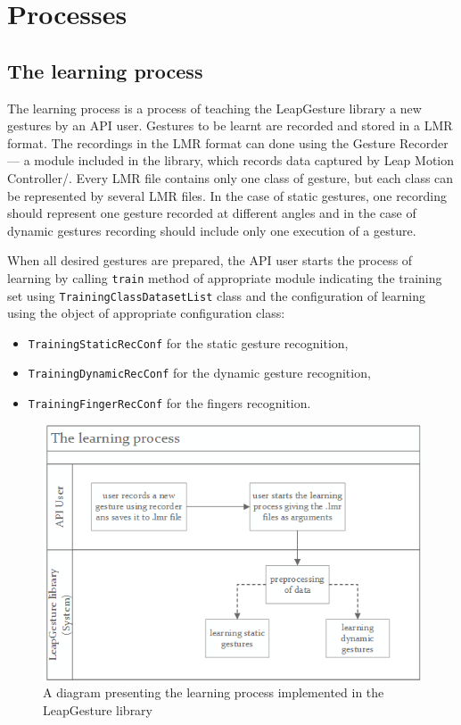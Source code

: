 \section{Processes}\label{processesSection}

\subsection{The learning process}
The learning process is a process of teaching the LeapGesture library a new gestures by an API user. 
Gestures to be learnt are recorded and stored in a LMR format. 
The recordings in the LMR format can done using the Gesture Recorder ---  a module included in the library, which records data captured by Leap Motion Controller/. 
Every LMR file contains only one class of gesture, but each class can be represented by several LMR files. 
In the case of static gestures, one recording should represent one gesture recorded at different angles and in the case of dynamic gestures recording should include only one execution of a gesture.

When all desired gestures are prepared, the API user starts the process of learning by calling \texttt{train} method of appropriate module indicating the training set using \texttt{TrainingClassDatasetList} class and the configuration of learning using the object of appropriate configuration class:
\begin{itemize}
\item \texttt{TrainingStaticRecConf} for the static gesture recognition,
\item \texttt{TrainingDynamicRecConf} for the dynamic gesture recognition,
\item \texttt{TrainingFingerRecConf} for the fingers recognition.
\end{itemize}


\begin{figure}[htb]
\centering
 \includegraphics[width=0.75\columnwidth]{figures/learningProcess.png}
 \caption{A diagram presenting the learning process implemented in the LeapGesture library}
 \label{learningprocess}
\end{figure}

